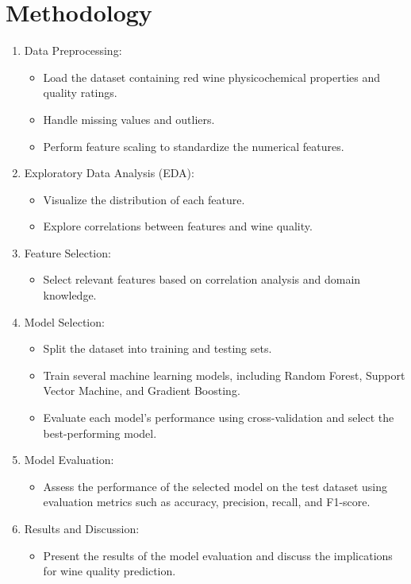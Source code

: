 \documentclass{article}
\begin{document}
\section{Methodology}
\begin{enumerate}
    \item Data Preprocessing:
    \begin{itemize}
        \item Load the dataset containing red wine physicochemical properties and quality ratings.
        \item Handle missing values and outliers.
        \item Perform feature scaling to standardize the numerical features.
    \end{itemize}

    \item Exploratory Data Analysis (EDA):
    \begin{itemize}
        \item Visualize the distribution of each feature.
        \item Explore correlations between features and wine quality.
    \end{itemize}

    \item Feature Selection:
    \begin{itemize}
        \item Select relevant features based on correlation analysis and domain knowledge.
    \end{itemize}

    \item Model Selection:
    \begin{itemize}
        \item Split the dataset into training and testing sets.
        \item Train several machine learning models, including Random Forest, Support Vector Machine, and Gradient Boosting.
        \item Evaluate each model's performance using cross-validation and select the best-performing model.
    \end{itemize}

    \item Model Evaluation:
    \begin{itemize}
        \item Assess the performance of the selected model on the test dataset using evaluation metrics such as accuracy, precision, recall, and F1-score.
    \end{itemize}

    \item Results and Discussion:
    \begin{itemize}
        \item Present the results of the model evaluation and discuss the implications for wine quality prediction.
    \end{itemize}

\end{enumerate}
\end{document}

